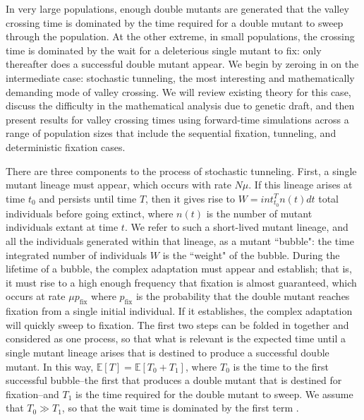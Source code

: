 \documentclass[rmp]{revtex4}
\newcommand{\comment}[2][noinline]{\todo[color=red,#1]{#2}}
\newcommand{\pfix}{p_{\mathrm{fix}}}
\begin{document}
\begin{spacing}{1.5}
In very large populations, enough double mutants are generated that the valley crossing time is dominated by the time required for a double mutant to sweep through the population.
At the other extreme, in small populations, the crossing time is dominated by the wait for a deleterious single mutant to fix: only thereafter does a successful double mutant appear.
We begin by zeroing in on the intermediate case: stochastic tunneling, the most interesting and mathematically demanding mode of valley crossing.
We will review existing theory for this case, discuss the difficulty in the mathematical analysis due to genetic draft, and then present results for valley crossing times using forward-time simulations across a range of population sizes that include the sequential fixation, tunneling, and deterministic fixation cases.

There are three components to the process of stochastic tunneling.
First, a single mutant lineage must appear, which occurs with rate $N\mu$.
If this lineage arises at time $t_0$ and persists until time $T$, then it gives rise to $W = int_{t_0}^T n(t) dt$ total individuals before going extinct, where $n(t)$ is the number of mutant individuals extant at time $t$.
We refer to such a short-lived mutant lineage, and all the individuals generated within that lineage, as a mutant ``bubble": the time integrated number of individuals $W$ is the ``weight" of the bubble.
During the lifetime of a bubble, the complex adaptation must appear and establish; that is, it must rise to a high enough frequency that fixation is almost guaranteed, which occurs at rate $\mu \pfix$ where $\pfix$ is the probability that the double mutant reaches fixation from a single initial individual.
If it establishes, the complex adaptation will quickly sweep to fixation.
The first two steps can be folded in together and considered as one process, so that what is relevant is the expected time until a single mutant lineage arises that is destined to produce a successful double mutant.
In this way, $\mathbb{E}\left[ T \right] = \mathbb{E} \left[ T_0 + T_1 \right]$, where $T_0$ is the time to the first successful bubble--the first that produces a double mutant that is destined for fixation--and $T_1$ is the time required for the double mutant to sweep.
We assume that $T_0 \gg T_1$, so that the wait time is dominated by the first term
\comment{JVC: justify this briefly}.


\end{spacing}
\end{document}
